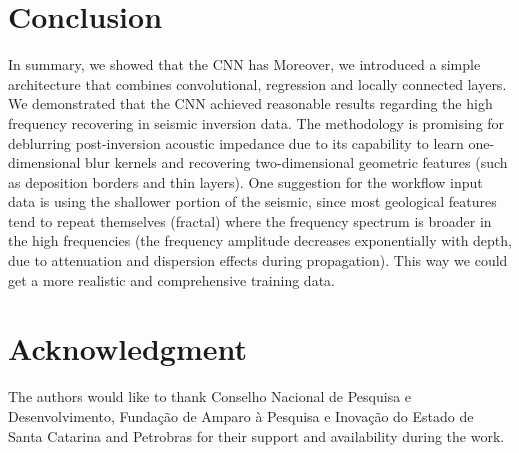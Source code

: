 \documentclass[journal]{IEEEtran}
\begin{document}
\section{Conclusion} \label{Conclusion}
In summary, we showed that the CNN has  Moreover, we introduced a simple architecture that combines convolutional, regression and locally connected layers. We demonstrated that the CNN achieved reasonable results regarding the high frequency recovering in seismic inversion data. The methodology is promising for deblurring post-inversion acoustic impedance due to its capability to learn one-dimensional blur kernels and recovering two-dimensional geometric features (such as deposition borders and thin layers). One suggestion for the workflow input data is using the shallower portion of the seismic, since most geological features tend to repeat themselves (fractal) where the frequency spectrum is broader in the high frequencies (the frequency amplitude decreases exponentially with depth, due to attenuation and dispersion effects during propagation). This way we could get a more realistic and comprehensive training data.

\section*{Acknowledgment}

The authors would like to thank Conselho Nacional de Pesquisa e Desenvolvimento, Fundação de Amparo à Pesquisa e Inovação do Estado de Santa Catarina and Petrobras for their support and availability during the work.

\ifCLASSOPTIONcaptionsoff
  \newpage
\fi
\end{document}
